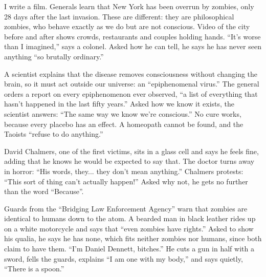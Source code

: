 
I write a film. Generals learn that New York has been overrun by zombies, only 28 days after the last invasion. These are different: they are philosophical zombies, who behave exactly as we do but are not conscious. Video of the city before and after shows crowds, restaurants and couples holding hands. ``It's worse than I imagined,'' says a colonel. Asked how he can tell, he says he has never seen anything ``so brutally ordinary.'' 

A scientist explains that the disease removes consciousness without changing the brain, so it must act outside our universe: an ``epiphenomenal virus.'' The general orders a report on every epiphenomenon ever observed, ``a list of everything that hasn't happened in the last fifty years.'' Asked how we know it exists, the scientist answers: ``The same way we know we're conscious.''  No cure works, because every placebo has an effect. A homeopath cannot be found, and the Taoists ``refuse to do anything.''

David Chalmers, one of the first victims, sits in a glass cell and says he feels fine, adding that he knows he would be expected to say that. The doctor turns away in horror: ``His words, they... they don't mean anything.'' Chalmers protests: ``This sort of thing can't actually happen!'' Asked why not, he gets no further than the word ``Because''. 

Guards from the ``Bridging Law Enforcement Agency'' warn that zombies are identical to humans down to the atom. A bearded man in black leather rides up on a white motorcycle and says that ``even zombies have rights.'' Asked to show his qualia, he says he has none, which fits neither zombies nor humans, since both claim to have them. ``I'm Daniel Dennett, bitches.'' He cuts a gun in half with a sword, fells the guards, explains ``I am one with my body,'' and says quietly, ``There is a spoon.''

